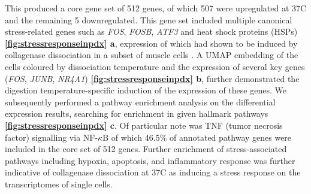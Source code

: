 This produced a core gene set of 512 genes, of which 507 were upregulated at 37\textdegree C and the remaining 5 downregulated. This gene set included multiple canonical stress-related genes such as \textit{FOS}, \textit{FOSB}, \textit{ATF3} and heat shock proteins (HSPs) \textbf{\autoref{fig:stressresponseinpdx} a}, expression of which had shown to be induced by collagenase dissociation in a subset of muscle cells \cite{van2017single}. A \ac{UMAP} embedding of the cells coloured by dissociation temperature and the expression of several key genes (\textit{FOS}, \textit{JUNB}, \textit{NR4A1}) \textbf{\autoref{fig:stressresponseinpdx} b}, further demonstrated the digestion temperature-specific induction of the expression of these genes.
We subsequently performed a pathway enrichment analysis on the differential expression results, searching for enrichment in given hallmark pathways \cite{liberzon2015molecular} \textbf{\autoref{fig:stressresponseinpdx} c}. Of particular note was TNF (tumor necrosis factor) signalling via NF-$\kappa$B of which 46.5\% of annotated pathway genes were included in the core set of 512 genes. Further enrichment of stress-associated pathways including hypoxia, apoptosis, and inflammatory response was further indicative of collagenase dissociation at 37\textdegree C as inducing a stress response on the transcriptomes of single cells.

